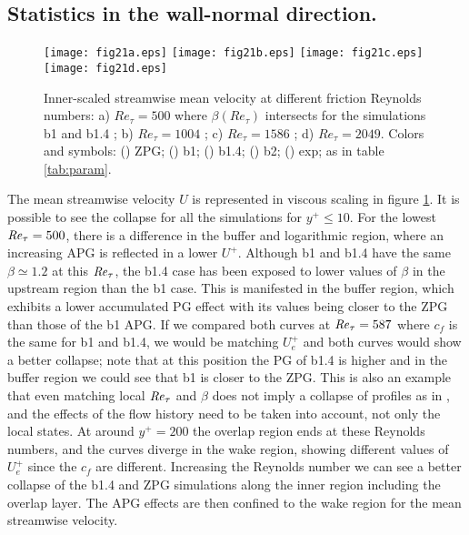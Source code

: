  \subsection*{ Statistics in the wall-normal direction.}
\begin{figure}
\texttt{[image: fig21a.eps]}
\texttt{[image: fig21b.eps]}
\texttt{[image: fig21c.eps]}
\texttt{[image: fig21d.eps]}
  \caption{ Inner-scaled streamwise mean velocity at different friction Reynolds numbers: a) $Re_{\tau}=500$ where $\beta(Re_{\tau})$ intersects for the simulations b1 and b1.4 ; b) $Re_{\tau}=1004$ ; c) $Re_{\tau}=1586$ ; d) $Re_{\tau}=2049$. Colors and symbols: (\protect\blackline) ZPG; (\protect\redline) b1; (\protect\orangeline) b1.4; (\protect\greenline) b2; (\protect\redcircle) exp; as in table \ref{tab:param}. }
\label{fig:meanU}
\end{figure}
 The mean streamwise velocity $U$ is represented in viscous scaling in figure \ref{fig:meanU}. It is possible to see the collapse for all the simulations for $y^+ \leq 10$. For the lowest $\mbox{\textit{Re}}_{\tau}=500$, there is a difference in the buffer and logarithmic region, where an increasing APG is reflected in a lower $U^+$. Although b1 and b1.4 have the same $\beta \simeq 1.2$ at this $\mbox{\textit{Re}}_{\tau}$, the b1.4 case has been exposed to lower values of $\beta$ in the upstream region than the b1 case. This is manifested in the buffer region, which exhibits a lower accumulated PG effect with its values being closer to the ZPG than those of the b1 APG. If we compared both curves at $\mbox{\textit{Re}}_{\tau}=587$ where $c_f$ is the same for b1 and b1.4, we would be matching $U_e^+$ and both curves would show a better collapse; note that at this position the PG of b1.4 is higher and in the buffer region we could see that b1 is closer to the ZPG. This is also an example that even matching local $\mbox{\textit{Re}}_{\tau}$ and $\beta$ does not imply a collapse of profiles as in \cite{tanarro_2020}, and the effects of the flow history need to be taken into account, not only the local states. At around $y^+=200$ the overlap region ends at these Reynolds numbers, and the curves diverge in the wake region, showing different values of $U_e^+$ since the $c_f$ are different.
Increasing the Reynolds number we can see a better collapse of the b1.4 and ZPG simulations along the inner region including the overlap layer. The APG effects are then confined to the wake region for the mean streamwise velocity. 


